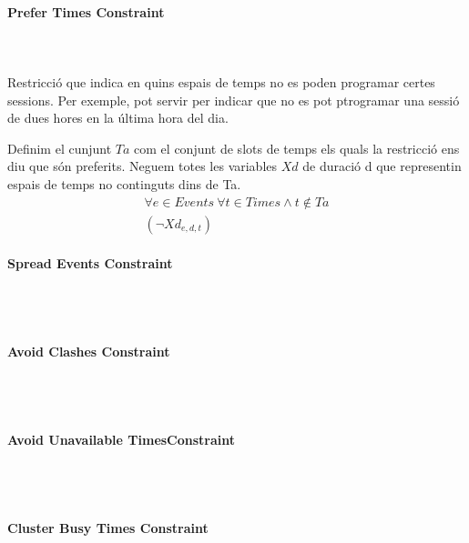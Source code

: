 \documentclass[11pt,a4paper,twoside]{report}
\begin{document}
  \paragraph*{Prefer Times Constraint} ~\\~\\
  Restricció que indica en quins espais de temps no es poden programar certes sessions. Per exemple, pot servir per indicar que no es pot ptrogramar una sessió de dues hores en la última hora del dia.

  Definim el cunjunt $Ta$ com el conjunt de slots de temps els quals la restricció ens diu que són preferits. Neguem totes les variables $Xd$ de duració d que representin espais de temps no continguts dins de Ta.
  \begin{gather*}
    \forall e \in Events \ \forall t \in Times \land t \notin Ta \\ (\neg Xd_{e,d,t})
  \end{gather*}


  \paragraph*{Spread Events Constraint} ~\\~\\



  \paragraph*{Avoid Clashes Constraint} ~\\~\\
  \paragraph*{Avoid Unavailable TimesConstraint} ~\\~\\
  \paragraph*{Cluster Busy Times Constraint} ~\\~\\
  


   
  
    
\end{document}
